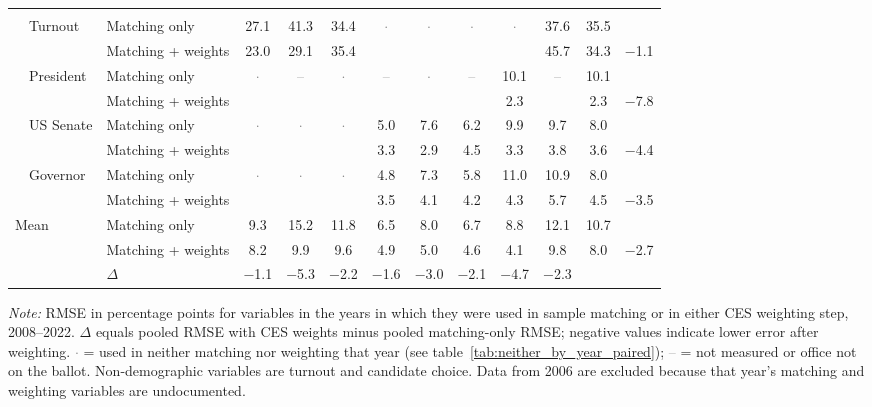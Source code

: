\begin{table}[!htbp]
{\begin{threeparttable}
\begin{tabular}{llcccccccccc}
\addlinespace[0.3em]
\multicolumn{12}{l}{Non-demographic} \\
\addlinespace[0.1em]
~~Turnout & Matching only & 27.1 & 41.3 & 34.4 & \textcolor{gray}{$\cdot$} & \textcolor{gray}{$\cdot$} & \textcolor{gray}{$\cdot$} & \textcolor{gray}{$\cdot$} & 37.6 & 35.5 & \\
 & Matching + weights & 23.0 & 29.1 & 35.4 &  &  &  &  & 45.7 & 34.3 & $-$1.1 \\
\addlinespace[0.1em]
~~President & Matching only & \textcolor{gray}{$\cdot$} & \textcolor{gray}{--} & \textcolor{gray}{$\cdot$} & \textcolor{gray}{--} & \textcolor{gray}{$\cdot$} & \textcolor{gray}{--} & 10.1 & \textcolor{gray}{--} & 10.1 & \\
 & Matching + weights &  &  &  &  &  &  & 2.3 &  & 2.3 & $-$7.8 \\
\addlinespace[0.1em]
~~US Senate & Matching only & \textcolor{gray}{$\cdot$} & \textcolor{gray}{$\cdot$} & \textcolor{gray}{$\cdot$} & 5.0 & 7.6 & 6.2 & 9.9 & 9.7 & 8.0 & \\
 & Matching + weights &  &  &  & 3.3 & 2.9 & 4.5 & 3.3 & 3.8 & 3.6 & $-$4.4 \\
\addlinespace[0.1em]
~~Governor & Matching only & \textcolor{gray}{$\cdot$} & \textcolor{gray}{$\cdot$} & \textcolor{gray}{$\cdot$} & 4.8 & 7.3 & 5.8 & 11.0 & 10.9 & 8.0 & \\
 & Matching + weights &  &  &  & 3.5 & 4.1 & 4.2 & 4.3 & 5.7 & 4.5 & $-$3.5 \\
\midrule
Mean\tnote{b} & Matching only & 9.3 & 15.2 & 11.8 & 6.5 & 8.0 & 6.7 & 8.8 & 12.1 & 10.7 & \\
 & Matching + weights & 8.2 & 9.9 & 9.6 & 4.9 & 5.0 & 4.6 & 4.1 & 9.8 & 8.0 & $-$2.7 \\
 & $\Delta$ & $-$1.1 & $-$5.3 & $-$2.2 & $-$1.6 & $-$3.0 & $-$2.1 & $-$4.7 & $-$2.3 & & \\
\bottomrule
\end{tabular}
\begin{tablenotes}
\footnotesize
\item \textit{Note:} RMSE in percentage points for variables in the years in which they were used in sample matching or in either CES weighting step, 2008--2022. $\Delta$ equals pooled RMSE with CES weights minus pooled matching-only RMSE; negative values indicate lower error after weighting. \textcolor{gray}{$\cdot$} = used in neither matching nor weighting that year (see table~\ref{tab:neither_by_year_paired}); \textcolor{gray}{--} = not measured or office not on the ballot. Non-demographic variables are turnout and candidate choice. Data from 2006 are excluded because that year's matching and weighting variables are undocumented.

\end{tablenotes}
\end{threeparttable}}
\end{table}
